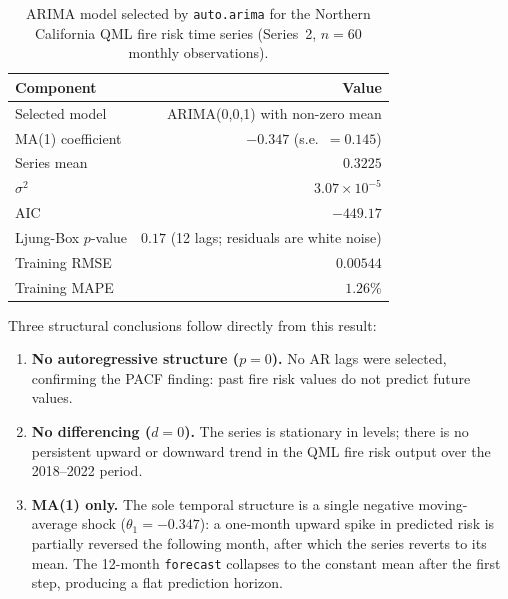 \documentclass[11pt,a4paper]{article}
\begin{document}
\begin{table}[H]
\centering
\caption{ARIMA model selected by \texttt{auto.arima} for the Northern California
         QML fire risk time series (Series~2, $n = 60$ monthly observations).}
\begin{tabular}{lr}
\toprule
\textbf{Component} & \textbf{Value} \\
\midrule
Selected model          & ARIMA(0,0,1) with non-zero mean \\
MA(1) coefficient       & $-0.347$ (s.e.\ $= 0.145$) \\
Series mean             & $0.3225$ \\
$\sigma^2$              & $3.07 \times 10^{-5}$ \\
AIC                     & $-449.17$ \\
Ljung-Box $p$-value     & $0.17$ (12 lags; residuals are white noise) \\
Training RMSE           & $0.00544$ \\
Training MAPE           & $1.26\%$ \\
\bottomrule
\end{tabular}
\label{tab:arima_fit}
\end{table}

Three structural conclusions follow directly from this result:

\begin{enumerate}[leftmargin=*]
    \item \textbf{No autoregressive structure ($p = 0$).} No AR lags were
          selected, confirming the PACF finding: past fire risk values do not
          predict future values.
    \item \textbf{No differencing ($d = 0$).} The series is stationary in
          levels; there is no persistent upward or downward trend in the QML
          fire risk output over the 2018--2022 period.
    \item \textbf{MA(1) only.} The sole temporal structure is a single
          negative moving-average shock ($\theta_1 = -0.347$): a one-month
          upward spike in predicted risk is partially reversed the following
          month, after which the series reverts to its mean. The 12-month
          \texttt{forecast} collapses to the constant mean after the first
          step, producing a flat prediction horizon.
\end{enumerate}
\end{document}

